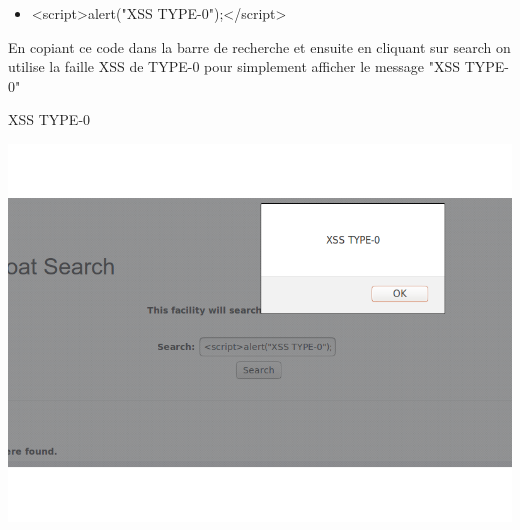 \bigskip

\begin{itemize}
\item <script>alert("XSS TYPE-0");</script>
\end{itemize}

\bigskip

\begin{flushleft}
En copiant ce code dans la barre de recherche et ensuite en cliquant sur search on utilise la faille XSS de TYPE-0 pour simplement afficher le message "XSS TYPE-0"
\end{flushleft}



\begin{center}
\caption{XSS TYPE-0}
\includegraphics[scale=0.3]{Web/assets/XSS0.png}
\end{center}

\bigskip

